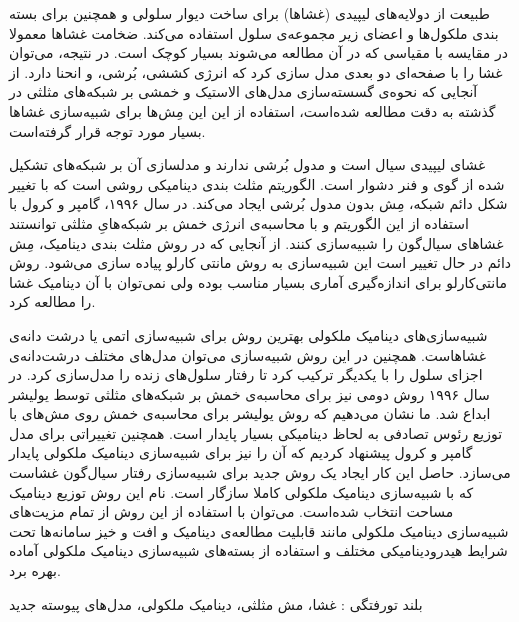 


طبیعت از دولایه‌های لیپیدی (غشاها) برای ساخت دیوار سلولی و همچنین برای بسته بندی ملکول‌ها و اعضای زیر مجموعه‌ی سلول استفاده می‌کند. ضخامت غشا‌ها معمولا در مقایسه با مقیاسی که در آن مطالعه می‌شوند بسیار کوچک است. در نتیجه، می‌توان غشا را با صفحه‌ای دو بعدی مدل سازی کرد که انرژی کششی، بُرشی، و انحنا دارد. از آنجایی که نحوه‌ی گسسته‌سازی مدل‌های الاستیک و خمشی بر شبکه‌های مثلثی در گذشته به دقت مطالعه شده‌است، استفاده از این این مِش‌ها برای شبیه‌سازی غشا‌ها بسیار مورد توجه قرار گرفته‌است.

غشای لیپیدی سیال است و مدول بُرشی ندارند و مدلسازی آن‌ بر شبکه‌های تشکیل شده از گوی و فنر دشوار است. الگوریتم مثلث بندی دینامیکی روشی است که با تغییر شکل دائم شبکه‌، مِش بدون مدول بُرشی ایجاد می‌کند. در سال ۱۹۹۶، گامپر و کرول با استفاده از این الگوریتم و با محاسبه‌ی انرژی خمش بر شبکه‌هایِ مثلثی توانستند غشا‌های سیال‌گون را شبیه‌سازی کنند. از آنجایی که در روش مثلث‌ بندی دینامیک، مِش دائم در حال تغییر است این شبیه‌سازی به روش مانتی کارلو پیاده سازی می‌شود. روش مانتی‌کارلو برای اندازه‌گیری آماری بسیار مناسب بوده ولی نمی‌توان با آن دینامیک غشا را مطالعه کرد. 

شبیه‌سازی‌های دینامیک ملکولی بهترین روش برای شبیه‌سازی اتمی یا درشت دانه‌ی غشا‌هاست. همچنین در این روش شبیه‌سازی می‌توان مدل‌های مختلف درشت‌دانه‌ی اجزای سلول را با یکدیگر ترکیب کرد تا رفتار سلول‌های زنده را مدل‌سازی کرد. در سال ۱۹۹۶ روش دومی نیز برای محاسبه‌ی خمش بر شبکه‌های مثلثی توسط یولیشر ابداع شد. ما نشان می‌دهیم که روش یولیشر برای محاسبه‌ی خمش روی مش‌های با توزیع رئوس تصادفی به لحاظ دینامیکی بسیار پایدار است. همچنین تغییراتی برای مدل گامپر و کرول پیشنهاد کردیم که آن را نیز برای شبیه‌سازی دینامیک ملکولی پایدار می‌سازد. حاصل این کار ایجاد یک روش جدید برای شبیه‌سازی رفتار سیال‌گون غشاست  که با شبیه‌سازی دینامیک ملکولی کاملا سازگار است. نام این روش توزیع دینامیک مساحت انتخاب شده‌است. می‌توان با استفاده از این روش از تمام مزیت‌های شبیه‌سازی دینامیک ملکولی مانند قابلیت مطالعه‌ی دینامیک و افت و خیز سامانه‌ها تحت شرایط هیدرودینامیکی مختلف و استفاده از بسته‌های شبیه‌سازی دینامیک ملکولی آماده بهره برد. 



‌بلند
‌تورفتگی : 
غشا، مش مثلثی، دینامیک ملکولی، مدل‌های پیوسته
‌جدید
